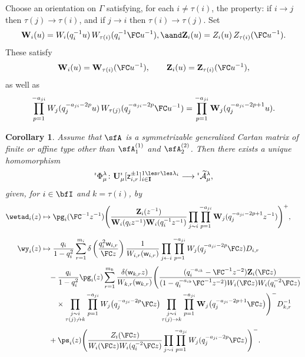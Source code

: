 \documentclass[reqno]{amsart}
\numberwithin{equation}{section}
\newtheorem*{corollary}{Corollary}
\begin{document}
Choose an orientation on $\Gamma$ satisfying, for each $i \neq \tau(i)$, the property: if $i \to j$ then $\tau(j)\to\tau(i)$, and if  $j \to i$ then $\tau(i)\to\tau(j)$. 
Set 
\begin{align} 
	\mathbf W_i(u)
	=W_i(q_i^{-1}u)\,
	W_{\tau(i)}(q_i^{-1}\FC u^{-1}),
	\aand 
	\mathbf Z_i(u)
	=Z_i(u)\,Z_{\tau(i)}(\FC u^{-1}).
\end{align}
These satisfy
\begin{align} \label{eq: igklo1}
	\mathbf W_i(u)=\mathbf W_{\tau(i)}(\FC u^{-1}),
	\qquad
	\mathbf Z_i(u)=\mathbf Z_{\tau(i)}(\FC u^{-1}), 
\end{align}
as well as 
\begin{align} \label{eq: igklo2}
	\prod_{p=1}^{-a_{ji}}
	W_j(q_j^{-a_{ji}-2p}u)\,
	W_{\tau(j)}(q_j^{-a_{ji}-2p}\FC u^{-1}) = 
	\prod_{p=1}^{-a_{ji}}
	\mathbf W_j(q_j^{-a_{ji}-2p+1}u).
\end{align}

\begin{corollary}
	Assume that $\sfA$ is a symmetrizable generalized Cartan matrix of finite or affine type other than $\sfA_1^{(1)}$ and $\sfA_2^{(2)}$.
	Then there exists a unique homomorphism 
	\[
	{}^\imath{\Phi}^{\lambda}_\mu \colon
	\mathbf{U}_\mu^\imath[\sz_{i,r}^{\pm 1}]_{i \in \mathbf{I}}^{1 \les r \les \lambda_i} \longrightarrow {}^\imath\widetilde{\diff}^\lambda_\mu, 
	\]
	given, for $i\in\bfI$ and $k=\tau(i)$, by
	\begin{align*}
		\wetad_i(z)
		&\mapsto
		\pg_i(\FC^{-1}z^{-1})
		\Biggl(
		\frac{\mathbf{Z}_i(z^{-1})}
		{\mathbf{W}_i(q_i z^{-1})\mathbf{W}_i(q_i^{-1}z^{-1})}
		\prod_{j\sim i}\prod_{p=1}^{-a_{ji}}
		\mathbf{W}_j(q_j^{-a_{ji}-2p+1}z^{-1})
		\Biggr)^+,
		\\[2mm]
		\wy_i(z)
		&\mapsto
		\frac{q_i}{1-q_i^2}
		\sum_{r=1}^{m_i}
		\delta\left(\frac{q_i^2\sw_{i,r}}{\FC z}\right)
		\frac{1}{W_{i,r}(\sw_{i,r})}
		\prod_{j\leftarrow i}\prod_{p=1}^{-a_{ji}}
		W_j(q_j^{-a_{ji}-2p}\FC z)D_{i,r}
		\\[1mm]
		&\quad-
		\frac{q_i}{1-q_i^2}\pg_i(z) \sum_{r=1}^{m_k}
		\frac{\delta(\sw_{k,r}z)}
		{W_{k,r}(\sw_{k,r})}
		\Biggl(
		\frac{
			(q_i^{-a_{ik}}-\FC^{-1}z^{-2})\mathbf{Z}_i(\FC z)}
		{
			(1-q_i^{-a_{ik}}\FC^{-1}z^{-2})
			W_i(\FC z)W_i(q_i^{-2}\FC z)}
		\\*
		&\qquad\times	
\prod_{\substack{j\sim i\\ \tau(j)\not\to k}}
\prod_{p=1}^{-a_{ji}}
W_j\bigl(q_j^{-a_{ji}-2p}\FC z\bigr)
\prod_{\substack{j\sim i\\ \tau(j)\to k}}
\prod_{p=1}^{-a_{ji}}
\mathbf W_j\bigl(q_j^{-a_{ji}-2p+1}\FC z\bigr)
		\Biggr)^- D_{k,r}^{-1}
		\\[1mm]
		&\quad+
		\ps_i(z)
		\Biggl(
		\frac{Z_i(\FC z)}
		{W_i(\FC z)W_i(q_i^{-2}\FC z)}
		\prod_{j\sim i}\prod_{p=1}^{-a_{ji}}
		W_j(q_j^{-a_{ji}-2p}\FC z)
		\Biggr)^-. 
	\end{align*} 
\end{corollary} 
\end{document}
